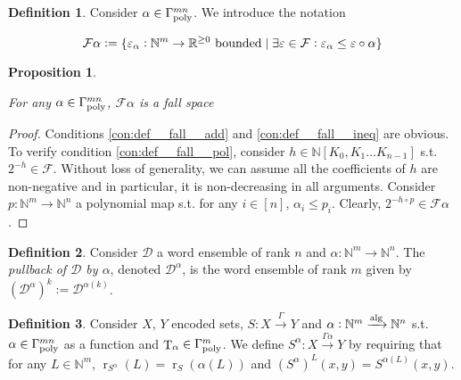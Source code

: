 \documentclass{article}
\numberwithin{equation}{section}
\theoremstyle{definition}
\newtheorem{definition}{Definition}[section]
\theoremstyle{plain}
\newtheorem{proposition}{Proposition}[section]
\DeclareMathOperator{\T}{T}
\DeclareMathOperator{\R}{r}
\newcommand{\Nats}{\mathbb{N}}
\newcommand{\Reals}{\mathbb{R}}
\newcommand{\NatPoly}{\Nats[K_0, K_1 \ldots K_{n-1}]}
\newcommand{\Dist}{\mathcal{D}}
\newcommand{\Fall}{\mathcal{F}}
\newcommand{\GammaPoly}{\Gamma_{\textnormal{poly}}}
\newcommand{\Alg}{\xrightarrow{\textnormal{alg}}}
\newcommand{\Scheme}{\xrightarrow{\Gamma}}
\begin{document}
\begin{samepage}
\begin{definition}

Consider ${\alpha \in \GammaPoly^{mn}}$. We introduce the notation

\begin{equation}
\label{eqn:tbd}
\Fall \alpha:=\{\varepsilon_\alpha: \Nats^m \rightarrow \Reals^{\geq 0} \textnormal{ bounded} \mid \exists \varepsilon \in \Fall: \varepsilon_\alpha \leq \varepsilon \circ \alpha\}
\end{equation}

\end{definition}
\end{samepage}

\begin{samepage}
\begin{proposition}
\label{prp:tbd}

For any ${\alpha \in \GammaPoly^{mn}}$, ${\Fall \alpha}$ is a fall space

\end{proposition}
\end{samepage}

\begin{proof}

Conditions \ref{con:def__fall__add} and \ref{con:def__fall__ineq} are obvious. To verify condition \ref{con:def__fall__pol}, consider ${h \in \NatPoly}$ s.t. ${2^{-h} \in \Fall}$. Without loss of generality, we can assume all the coefficients of ${h}$ are non-negative and in particular, it is non-decreasing in all arguments. Consider ${p: \Nats^m \rightarrow \Nats^n}$ a polynomial map s.t. for any ${i \in [n]}$, ${\alpha_i \leq p_i}$. Clearly, ${2^{-h \circ p} \in \Fall \alpha}$.
%
\end{proof}

\begin{samepage}
\begin{definition}

Consider ${\Dist}$ a word ensemble of rank ${n}$ and ${\alpha: \Nats^m \rightarrow \Nats^n}$. The \emph{pullback of ${\Dist}$ by ${\alpha}$}, denoted ${\Dist^\alpha}$, is the word ensemble of rank ${m}$ given by ${(\Dist^\alpha)^k:=\Dist^{\alpha(k)}}$.

\end{definition}
\end{samepage}

\begin{samepage}
\begin{definition}

Consider ${X}$, ${Y}$ encoded sets, ${S: X \Scheme Y}$ and ${\alpha: \Nats^m \Alg \Nats^n}$ s.t. ${\alpha \in \GammaPoly^{mn}}$ as a function and ${\T_\alpha \in \GammaPoly^m}$. We define ${S^\alpha: X \xrightarrow{\Gamma \alpha} Y}$ by requiring that for any ${L \in \Nats^m}$, ${\R_{S^\alpha}(L)=\R_S(\alpha(L))}$ and ${(S^\alpha)^L(x,y)=S^{\alpha(L)}(x,y)}$.

\end{definition}
\end{samepage}
\end{document}
